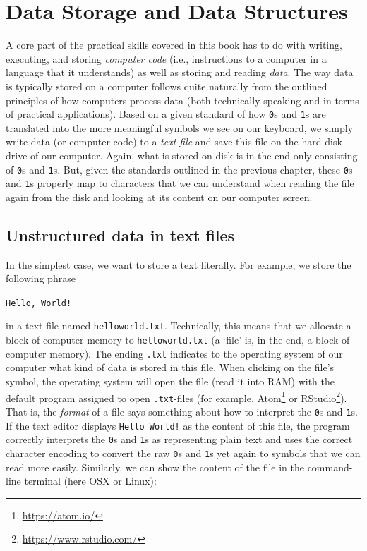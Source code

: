\documentclass[
  12pt,
]{style/krantz}
\renewcommand{\href}[2]{#2\footnote{\url{#1}}}
\begin{document}
\hypertarget{data-storage-and-data-structures}{%
\chapter{Data Storage and Data Structures}\label{data-storage-and-data-structures}}

A core part of the practical skills covered in this book has to do with writing, executing, and storing \emph{computer code} (i.e., instructions to a computer in a language that it understands) as well as storing and reading \emph{data}. The way data is typically stored on a computer follows quite naturally from the outlined principles of how computers process data (both technically speaking and in terms of practical applications). Based on a given standard of how \texttt{0}s and \texttt{1}s are translated into the more meaningful symbols we see on our keyboard, we simply write data (or computer code) to a \emph{text file} and save this file on the hard-disk drive of our computer. Again, what is stored on disk is in the end only consisting of \texttt{0}s and \texttt{1}s. But, given the standards outlined in the previous chapter, these \texttt{0}s and \texttt{1}s properly map to characters that we can understand when reading the file again from the disk and looking at its content on our computer screen.

\hypertarget{unstructured-data-in-text-files}{%
\section{Unstructured data in text files}\label{unstructured-data-in-text-files}}

In the simplest case, we want to store a text literally. For example, we store the following phrase

\texttt{Hello,\ World!}

in a text file named \texttt{helloworld.txt}. Technically, this means that we allocate a block of computer memory to \texttt{helloworld.txt} (a `file' is, in the end, a block of computer memory). The ending \texttt{.txt} indicates to the operating system of our computer what kind of data is stored in this file. When clicking on the file's symbol, the operating system will open the file (read it into RAM) with the default program assigned to open \texttt{.txt}-files (for example, \href{https://atom.io/}{Atom} or \href{https://www.rstudio.com/}{RStudio}). That is, the \emph{format} of a file says something about how to interpret the \texttt{0}s and \texttt{1}s. If the text editor displays \texttt{Hello\ World!} as the content of this file, the program correctly interprets the \texttt{0}s and \texttt{1}s as representing plain text and uses the correct character encoding to convert the raw \texttt{0}s and \texttt{1}s yet again to symbols that we can read more easily. Similarly, we can show the content of the file in the command-line terminal (here OSX or Linux):
\end{document}
